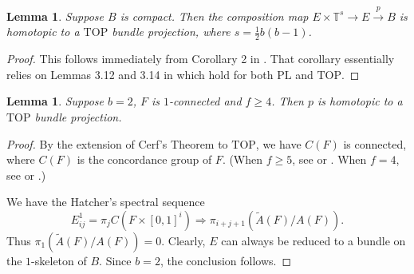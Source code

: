 \documentclass[12pt]{amsart}
\theoremstyle{plain}
\newtheorem{lemma}[theorem]{Lemma}
\theoremstyle{definition}
\theoremstyle{question}
\theoremstyle{remark}
\theoremstyle{assumption}
\numberwithin{equation}{section}
\theoremstyle{bigthm}
\begin{document}
\begin{lemma}\label{lem_stable}
Suppose $B$ is compact. Then the composition map $E \times \mathbb{T}^{s} \rightarrow E \overset{p}{\rightarrow} B$ is homotopic to a $\mathrm{TOP}$ bundle projection, where $s= \tfrac{1}{2} b(b-1)$.
\end{lemma}
\begin{proof}
This follows immediately from Corollary 2 in \cite[p.~42]{BLR1975}. That corollary essentially relies on Lemmas 3.12 and 3.14 in \cite{BLR1975} which hold for both $\mathrm{PL}$ and $\mathrm{TOP}$.
\end{proof}

\begin{lemma}\label{lem_base_2_dim}
Suppose $b=2$, $F$ is $1$-connected and $f \ge 4$. Then $p$ is homotopic to a $\mathrm{TOP}$ bundle projection.
\end{lemma}
\begin{proof}
By the extension of Cerf's Theorem to $\mathrm{TOP}$, we have $C(F)$ is connected, where $C(F)$ is the concordance group of $F$. (When $f \ge 5$, see \cite[p.~116]{Kirby_Siebenmann} or \cite[Theorem~3.1]{Hatcher}. When $f = 4$, see \cite[Corollaire~1]{Perron} or \cite[Theorem~1.4]{Quinn86}.)

We have the Hatcher's spectral sequence \cite[Proposition~2.1]{Hatcher}
\[
E_{ij}^{1} = \pi_{j} C(F \times [0,1]^{i}) \Longrightarrow \pi_{i+j+1} (\tilde{A} (F) / A(F)).
\]
Thus $\pi_{1} (\tilde{A} (F) / A(F)) =0$. Clearly, $E$ can always be reduced to a bundle on the $1$-skeleton of $B$. Since $b=2$, the conclusion follows.
\end{proof}
\end{document}
